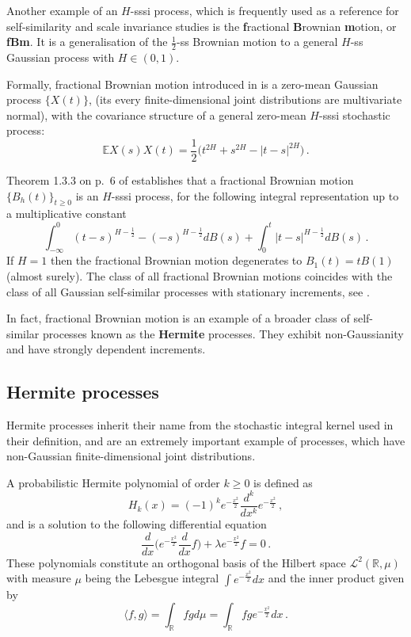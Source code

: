 \documentclass[a4paper]{article}
\newcommand{\Real}{\mathbb{R}}
\newcommand{\ex}{\mathbb{E}}
\newcommand{\Lcal}{\mathcal{L}}
\begin{document}
Another example of an $H$-sssi process, which is frequently used as a reference for
self-similarity and scale invariance studies is the \textbf{f}ractional \textbf{B}rownian
\textbf{m}otion, or \textbf{fBm}. It is a generalisation of the $\tfrac{1}{2}$-ss
Brownian motion to a general $H$-ss Gaussian process with $H\in (0, 1)$.

Formally, fractional Brownian motion introduced in \cite{doi:10.1137/1010093} is a
zero-mean Gaussian process $\bigl\{X(t)\bigr\}$, (its every finite-dimensional joint
distributions are multivariate normal), with the covariance structure of a general
zero-mean $H$-sssi stochastic process:
\[ \ex X(s) X(t) = \frac{1}{2} \bigl(t^{2H} + s^{2H} - |t-s|^{2H}\bigr) \,. \]

Theorem 1.3.3 on p.~6 of \cite{embrechtsselfsimilar} establishes that a fractional
Brownian motion $\{B_h(t)\}_{t\geq 0}$ is an $H$-sssi process, for the following
integral representation up to a multiplicative constant
\[
\int_{-\infty}^0 (t-s)^{H-\tfrac{1}{2}} - (-s)^{H-\tfrac{1}{2}} dB(s)
+ \int_0^t |t-s|^{H-\tfrac{1}{2}} dB(s) \,.
\]
If $H = 1$ then the fractional Brownian motion degenerates to $B_1(t) = tB(1)$ (almost
surely). The class of all fractional Brownian motions coincides with the class of all
Gaussian self-similar processes with stationary increments, see \cite{embrechtsselfsimilar}. 

In fact, fractional Brownian motion is an example of a broader class of self-similar
processes known as the \textbf{Hermite} processes. They exhibit non-Gaussianity and have
strongly dependent increments.


\subsection{Hermite processes} %
\label{sub:hermite_processes}

Hermite processes inherit their name from the stochastic integral kernel used in
their definition, and are an extremely important example of processes, which have 
non-Gaussian finite-dimensional joint distributions.

A probabilistic Hermite polynomial of order $k\geq0$ is defined as 
\[ H_k(x) = (-1)^k e^{-\frac{x^2}{2}} \frac{d^k}{dx^k} e^{-\frac{x^2}{2}} \,,\]
and is a solution to the following differential equation
\[
 \frac{d}{dx}\biggl( e^{-\frac{x^2}{2}} \frac{d}{dx} f\biggr) + \lambda e^{-\frac{x^2}{2}} f = 0 \,.
\]
These polynomials constitute an orthogonal basis of the Hilbert space $\Lcal^2(\Real, \mu)$
with measure $\mu$ being the Lebesgue integral $\int e^{-\frac{x^2}{2}} dx$ and the inner
product given by
\[
\langle f, g\rangle = \int_\Real f g d\mu = \int_\Real f g e^{-\frac{x^2}{2}} dx \,.
\]
\end{document}
